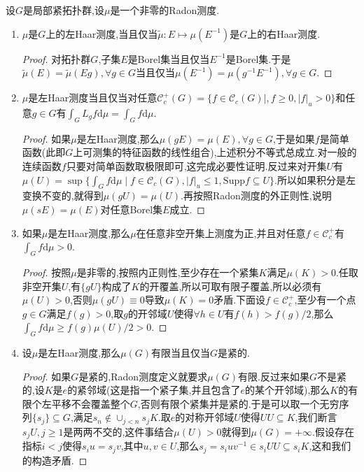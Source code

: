 设$G$是局部紧拓扑群,设$\mu$是一个非零的Radon测度.
\begin{enumerate}
	\item $\mu$是$G$上的左Haar测度,当且仅当$\widetilde{\mu}:E\mapsto\mu(E^{-1})$是$G$上的右Haar测度.
	\begin{proof}
		
		对拓扑群$G$,子集$E$是Borel集当且仅当$E^{-1}$是Borel集.于是$\widetilde{\mu}(E)=\widetilde{\mu}(Eg),\forall g\in G$当且仅当$\mu(E^{-1})=\mu(g^{-1}E^{-1}),\forall g\in G$.
	\end{proof}
    \item $\mu$是左Haar测度当且仅当对任意$\mathscr{C}_c^+(G)=\{f\in\mathscr{C}_c(G)\mid,f\ge0,|f|_u>0\}$和任意$g\in G$有$\int_GL_gf\mathrm{d}\mu=\int_Gf\mathrm{d}\mu$.
    \begin{proof}
    	
    	如果$\mu$是左Haar测度,那么$\mu(gE)=\mu(E),\forall g\in G$,于是如果$f$是简单函数(此即$G$上可测集的特征函数的线性组合),上述积分不等式总成立.对一般的连续函数$f$只要对简单函数取极限即可,这完成必要性证明.反过来对开集$U$有$\mu(U)=\sup\{\int_Gf\mathrm{d}\mu\mid f\in\mathscr{C}_c(G),|f|_u\le1,\mathrm{Supp}f\subseteq U\}$.所以如果积分是左变换不变的,就得到$\mu(gU)=\mu(U)$.再按照Radon测度的外正则性,说明$\mu(sE)=\mu(E)$对任意Borel集$E$成立.
    \end{proof}
    \item 如果$\mu$是左Haar测度,那么$\mu$在任意非空开集上测度为正,并且对任意$f\in\mathscr{C}_c^+$有$\int_Gf\mathrm{d}\mu>0$.
    \begin{proof}
    	
    	按照$\mu$是非零的,按照内正则性,至少存在一个紧集$K$满足$\mu(K)>0$.任取非空开集$U$,有$\{gU\}$构成了$K$的开覆盖,所以可取有限子覆盖,所以必须有$\mu(U)>0$,否则$\mu(gU)\equiv0$导致$\mu(K)=0$矛盾.下面设$f\in\mathscr{C}_c^+$,至少有一个点$g\in G$满足$f(g)>0$,取$g$的开邻域$U$使得$\forall h\in U$有$f(h)>f(g)/2$,那么$\int_Gf\mathrm{d}\mu\ge f(g)\mu(U)/2>0$.
    \end{proof}
    \item 设$\mu$是左Haar测度,那么$\mu(G)$有限当且仅当$G$是紧的.
    \begin{proof}
    	
    	如果$G$是紧的,Radon测度定义就要求$\mu(G)$有限.反过来如果$G$不是紧的,设$K$是$e$的紧邻域(这是指一个紧子集,并且包含了$e$的某个开邻域),那么$K$的有限个左平移不会覆盖整个$G$,否则有限个紧集并是紧的.于是可以取一个无穷序列$\{s_j\}\subseteq G$,满足$s_n\not\in\cup_{j<n}s_jK$.取$e$的对称开邻域$U$使得$UU\subseteq K$,我们断言$s_jU,j\ge1$是两两不交的,这件事结合$\mu(U)>0$就得到$\mu(G)=+\infty$.假设存在指标$i<j$使得$s_iu=s_jv$,其中$u,v\in U$,那么$s_j=s_iuv^{-1}\in s_iUU\subseteq s_iK$,这和我们的构造矛盾.
    \end{proof}
\end{enumerate}

